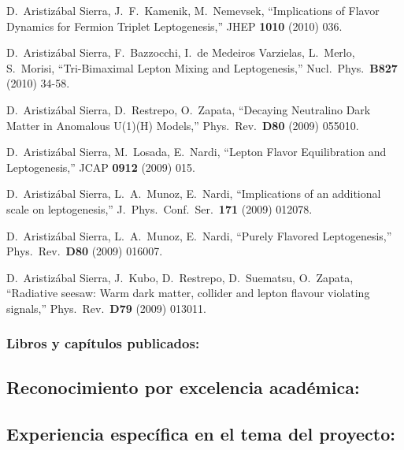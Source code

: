   D.~Aristizábal Sierra, J.~F.~Kamenik, M.~Nemevsek,
  ``Implications of Flavor Dynamics for Fermion Triplet Leptogenesis,''
  JHEP {\bf 1010 } (2010)  036.

  D.~Aristizábal Sierra, F.~Bazzocchi, I.~de Medeiros Varzielas, L.~Merlo, S.~Morisi,
  ``Tri-Bimaximal Lepton Mixing and Leptogenesis,''
  Nucl.\ Phys.\  {\bf B827 } (2010)  34-58.

  D.~Aristizábal Sierra, D.~Restrepo, O.~Zapata,
  ``Decaying Neutralino Dark Matter in Anomalous U(1)(H) Models,''
  Phys.\ Rev.\  {\bf D80 } (2009)  055010.

  D.~Aristizábal Sierra, M.~Losada, E.~Nardi,
  ``Lepton Flavor Equilibration and Leptogenesis,''
  JCAP {\bf 0912 } (2009)  015.

  D.~Aristizábal Sierra, L.~A.~Munoz, E.~Nardi,
  ``Implications of an additional scale on leptogenesis,''
  J.\ Phys.\ Conf.\ Ser.\  {\bf 171 } (2009)  012078.

  D.~Aristizábal Sierra, L.~A.~Munoz, E.~Nardi,
  ``Purely Flavored Leptogenesis,''
  Phys.\ Rev.\  {\bf D80 } (2009)  016007.

  D.~Aristizábal Sierra, J.~Kubo, D.~Restrepo, D.~Suematsu, O.~Zapata,
  ``Radiative seesaw: Warm dark matter, collider and lepton flavour violating signals,''
  Phys.\ Rev.\  {\bf D79 } (2009)  013011.
\subsubsection{Libros y capítulos publicados:}
\subsection{Reconocimiento por excelencia académica:}
\subsection{Experiencia específica en el tema del proyecto:}
